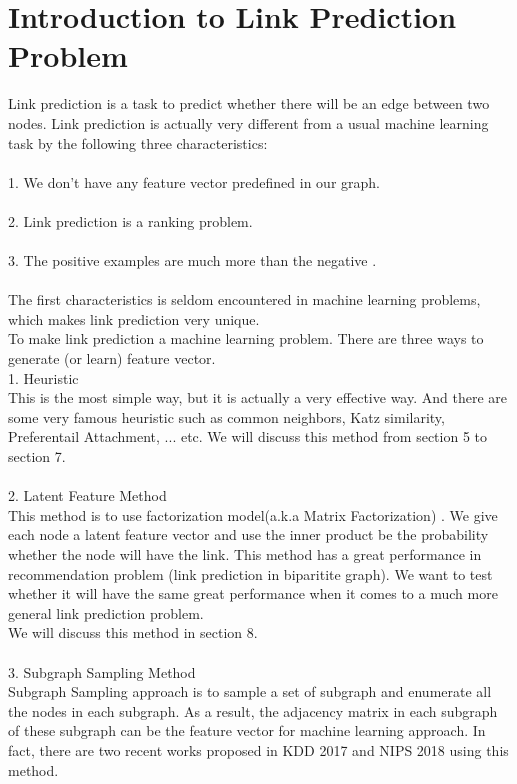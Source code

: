 \documentclass[12pt]{article}
\begin{document}
\section{Introduction to Link Prediction Problem}
Link prediction is a task to predict whether there will be an edge between two nodes. Link prediction is actually very different from a usual machine learning task by the following three characteristics:
\\ \\
1. We don't have any feature vector predefined in our graph. 
\\ \\
2. Link prediction is a ranking problem.
\\ \\
3. The positive examples are much more than the negative . 
\\  \\
The first characteristics is seldom encountered in machine learning problems, which makes link prediction very unique.  \\
To make link prediction a machine learning problem. There are three ways to generate (or learn) feature vector. \\
1. Heuristic \\ 
This is the most simple way, but it is actually a very effective way. And there are some very famous heuristic such as common neighbors, Katz similarity, Preferentail Attachment, ... etc.  We will discuss this method from section 5 to section 7. \\ \\
2. Latent Feature Method \\
This method is to use factorization model(a.k.a Matrix Factorization) \cite{mf}. We give each node a latent feature vector and use the inner product be the probability whether the node will have the link. This method has a great performance in recommendation problem (link prediction in biparitite graph). We want to test whether it will have the same great performance when it comes to a much more general link prediction problem. 
\\
We will discuss this method in section 8.
\\ \\
3. Subgraph Sampling Method \\ 
Subgraph Sampling approach is to sample a set of subgraph and enumerate all the nodes in each subgraph. As a result, the adjacency matrix in each subgraph of these subgraph can be the feature vector for machine learning approach. In fact, there are two recent works proposed in KDD 2017 \cite{lp2017} and NIPS 2018 \cite{lp2018} using this method. 
\end{document}
